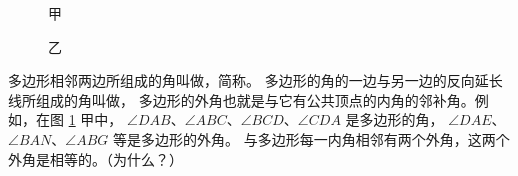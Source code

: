 \begin{figure}[htbp]
    \centering
    \begin{minipage}[b]{7cm}
        \centering
        
        \caption*{甲}
    \end{minipage}
    \qquad
    \begin{minipage}[b]{7cm}
        \centering
        
        \caption*{乙}
    \end{minipage}
    \caption{}\label{fig:czjh1-4-3}
\end{figure}


多边形相邻两边所组成的角叫做，简称。
多边形的角的一边与另一边的反向延长线所组成的角叫做，
多边形的外角也就是与它有公共顶点的内角的邻补角。例如，在图 \ref{fig:czjh1-4-3} 甲中，
$\angle DAB$、$\angle ABC$、$\angle BCD$、$\angle CDA$ 是多边形的角，
$\angle DAE$、$\angle BAN$、$\angle ABG$ 等是多边形的外角。
与多边形每一内角相邻有两个外角，这两个外角是相等的。（为什么？）

\begin{lianxi}



\end{lianxi}

